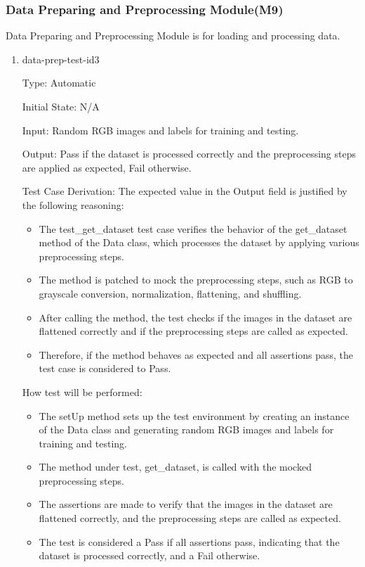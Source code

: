\documentclass[12pt, titlepage]{article}
\begin{document}
\subsubsection{Data Preparing and Preprocessing Module(M9)}
Data Preparing and Preprocessing Module is for loading and processing data.

\begin{enumerate}

  \item{data-prep-test-id3\\}
  
  Type: Automatic
            
  Initial State: N/A
            
  Input: Random RGB images and labels for training and testing.
            
  Output: Pass if the dataset is processed correctly and the preprocessing steps 
          are applied as expected, Fail otherwise.
  
  Test Case Derivation: The expected value in the Output field is justified by 
  the following reasoning:
  \begin{itemize}
    \item The test\_get\_dataset test case verifies the behavior of the 
    get\_dataset method of the Data class, which processes the dataset 
    by applying various preprocessing steps.
    \item The method is patched to mock the preprocessing steps, such as 
    RGB to grayscale conversion, normalization, flattening, and shuffling.
    \item After calling the method, the test checks if the images in the 
    dataset are flattened correctly and if the preprocessing steps are called as expected.
    \item Therefore, if the method behaves as expected and all assertions 
    pass, the test case is considered to Pass.
  \end{itemize}
  
  
  How test will be performed: 
  \begin{itemize}
    \item The setUp method sets up the test environment by creating an 
    instance of the Data class and generating random RGB images and 
    labels for training and testing.
    \item The method under test, get\_dataset, is called with the 
    mocked preprocessing steps.
    \item The assertions are made to verify that the images in the 
    dataset are flattened correctly, and the preprocessing steps are 
    called as expected.
    \item The test is considered a Pass if all assertions pass, 
    indicating that the dataset is processed correctly, and a Fail otherwise.
  \end{itemize}

\end{enumerate}
\end{document}
